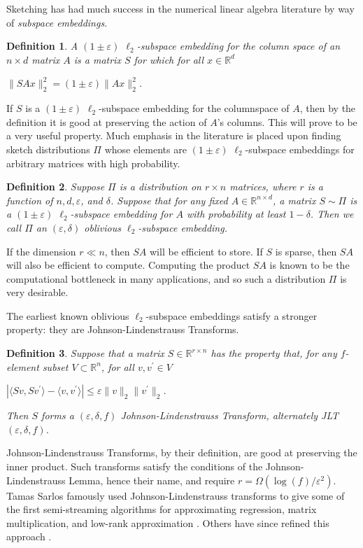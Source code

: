 \documentclass{report}
\newtheorem{definition}{Definition}[section]
\begin{document}
Sketching has had much success in the numerical linear algebra literature by way of \emph{subspace embeddings}.
%
\begin{definition}
A $(1 \pm \varepsilon)$ $\ell_2$-subspace embedding for the column space of an $n \times d$ matrix $A$ is a matrix $S$ for which for all $x \in \mathbb{R}^d$
\begin{center}
$\|SAx\|_2^2 = (1 \pm \varepsilon)\|Ax\|_2^2$.
\end{center}
\end{definition}
%
If $S$ is a  $(1 \pm \varepsilon)$ $\ell_2$-subspace embedding for the columnspace of $A$, then by the definition it is good at preserving the action of $A$'s columns.
This will prove to be a very useful property. 
Much emphasis in the literature is placed upon finding sketch distributions $\Pi$ whose elements are $(1 \pm \varepsilon)$ $\ell_2$-subspace embeddings for arbitrary matrices with high probability. 
%
\begin{definition}
Suppose $\Pi$ is a distribution on $r \times n$ matrices, where $r$ is a function of $n, d, \varepsilon$, and $\delta$. 
Suppose that for any fixed $A \in \mathbb{R}^{n\times d}$, a matrix $S \sim \Pi$ is a $(1\pm \varepsilon)$ $\ell_2$-subspace embedding for $A$ with probability at least $1-\delta$. 
Then we call $\Pi$ an $(\varepsilon, \delta)$ oblivious $\ell_2$-subspace embedding.
\end{definition}
%
If the dimension $r \ll n$, then $SA$ will be efficient to store.
If $S$ is sparse, then $SA$ will also be efficient to compute. 
Computing the product $SA$ is known to be the computational bottleneck in many applications, and so such a distribution $\Pi$ is very desirable. 

The earliest known oblivious $\ell_2$-subspace embeddings satisfy a stronger property: they are Johnson-Lindenstrauss Transforms.
%
\begin{definition}
Suppose that a matrix $S \in \mathbb{R}^{r \times n}$ has the property that, for any $f$-element subset $V \subset \mathbb{R}^n$, for all $v, v^\prime \in V$
\begin{center}
$|\langle Sv, Sv^\prime \rangle - \langle v, v^\prime \rangle | \leq \varepsilon \|v\|_2\|v^\prime \|_2$.
\end{center}
Then $S$ forms a $(\varepsilon, \delta, f)$ Johnson-Lindenstrauss Transform, alternately JLT$(\varepsilon, \delta, f)$.
\end{definition}
%
Johnson-Lindenstrauss Transforms, by their definition, are good at preserving the inner product.
Such transforms satisfy the conditions of the Johnson-Lindenstrauss Lemma, hence their name, and require $r = \Omega(\log(f)/\varepsilon^2)$.
Tamas Sarlos famously used Johnson-Lindenstrauss transforms to give some of the first semi-streaming algorithms for approximating regression, matrix multiplication, and low-rank approximation \cite{sarlos2006improved}. 
Others have since refined this approach \cite{clarkson2009numerical,clarkson2017low}. 
\end{document}
